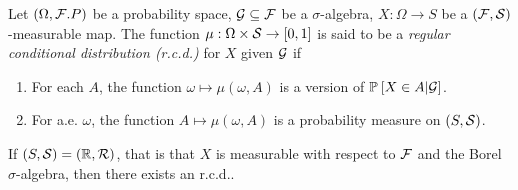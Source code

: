 \begin{defi}
    Let $\left(\Omega, \mathcal{F}. P\right)$ be a probability space, $\mathcal{G} \subseteq \mathcal{F}$ be a $\sigma$-algebra, $X: \Omega \rightarrow S$ be a $(\mathcal{F}, \mathcal{S})$-measurable map. The function $\mu: \Omega \times \mathcal{S} \rightarrow [0, 1]$ is said to be a {\it regular conditional distribution (r.c.d.)} for $X$ given $\mathcal{G}$ if
    \begin{enumerate}[label=(\roman*)]
        \item For each $A$, the function $\omega \mapsto \mu(\omega, A)$ is a version of ${\mathbb P}_{}\left[X \in A | \mathcal{G}\right]$.
        \item For a.e. $\omega$, the function $A \mapsto \mu(\omega, A)$ is a probability measure on $(S, \mathcal{S})$.
    \end{enumerate}
\end{defi}

\begin{thm}
    If $(S, \mathcal{S}) = (\mathbb{R}, \mathcal{R})$, that is that $X$ is measurable with respect to $\mathcal{F}$ and the Borel $\sigma$-algebra, then there exists an r.c.d..
\end{thm}




